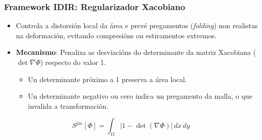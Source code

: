 \documentclass[xcolor=dvipsnames]{beamer}
\begin{document}
    

    

\begin{frame}
\frametitle{Framework IDIR: Regularizador Xacobiano}

\begin{itemize}
    \item Controla a distorsión local da área e prevé pregamentos (\textit{folding}) non realistas na deformación, evitando compresións ou estiramentos extremos.
    \vspace{0.3cm}
    \item \textbf{Mecanismo}: Penaliza as desviacións do determinante da matriz Xacobiana ($\det \nabla \Phi$) respecto do valor 1.
    \begin{itemize}
        \item Un determinante próximo a 1 preserva a área local.
        \item Un determinante negativo ou cero indica un pregamento da malla, o que invalida a transformación.
    \end{itemize}
\end{itemize}

\vfill %

\centering
$$
S^{\text{jac}}[\Phi] = \int_{\Omega} \left| 1 - \det(\nabla \Phi) \right| \, dx \, dy
$$


\end{frame}
\end{document}
